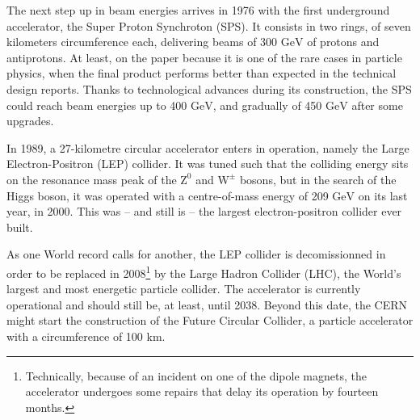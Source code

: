 \documentclass[ALICE,manyauthors]{cernphprep}
\newcommand {\unitStyle}[1] {\mbox{\ensuremath{\text{#1}}}}
\newcommand {\gev}      {\unitStyle{GeV}\xspace}
\newcommand{\rmWplusminus}  {\mbox{$\mathrm {W^{\pm}}$}\xspace}
\newcommand{\rmZzero}       {\mbox{$\mathrm {Z}^{0}$}\xspace}
\providecommand{\DIFaddtex}[1]{{\protect\color{blue}\uwave{#1}}} %
\providecommand{\DIFaddbegin}{} %
\providecommand{\DIFaddend}{} %
\providecommand{\DIFadd}[1]{\texorpdfstring{\DIFaddtex{#1}}{#1}} %
\newcommand{\DIFaddincludegraphics}[2][]{{\color{blue}\fbox{\DIFOincludegraphics[#1]{#2}}}} %
\DeclareRobustCommand{\DIFaddbegin}{\DIFOaddbegin \let\includegraphics\DIFaddincludegraphics} %
\DeclareRobustCommand{\DIFaddend}{\DIFOaddend \let\includegraphics\DIFOincludegraphics} %
\begin{document}
The next step up in beam energies arrives in 1976 with the first underground accelerator, the Super Proton Synchroton (SPS). It consists in two rings, of seven kilometers circumference each, delivering beams of 300 \gev of protons and antiprotons. At least, on the paper because it is one of the rare cases in particle physics, when the final product performs better than expected in the technical design reports. Thanks to technological advances during its construction, the SPS could reach beam energies up to 400 \gev, and gradually of 450 \gev after some upgrades.

In 1989, a 27-kilometre circular accelerator enters in operation, namely the Large Electron-Positron (LEP) collider. It was tuned such that the colliding energy sits on the resonance mass peak of the \rmZzero and \rmWplusminus bosons, but in the search of the Higgs boson, it was \DIFaddbegin \DIFadd{also }\DIFaddend operated with a centre-of-mass energy of 209 \gev on its last year, in 2000. This was -- and still is -- the largest electron-positron collider ever built.

As one World record calls for another, the LEP collider is decomissionned in order to be replaced in 2008\footnote{Technically, because of an incident on one of the dipole magnets, the accelerator undergoes some repairs that delay its operation by fourteen months.} by the Large Hadron Collider (LHC), the World's largest and most energetic particle collider. The accelerator is currently operational and should still be, at least, until 2038. Beyond this date, the CERN might start the construction of the Future Circular Collider, a particle accelerator with a circumference of 100 km\cite{FutureCircularCollider2023}\cite{benediktFutureCircularCollider2019}.\\
\end{document}
